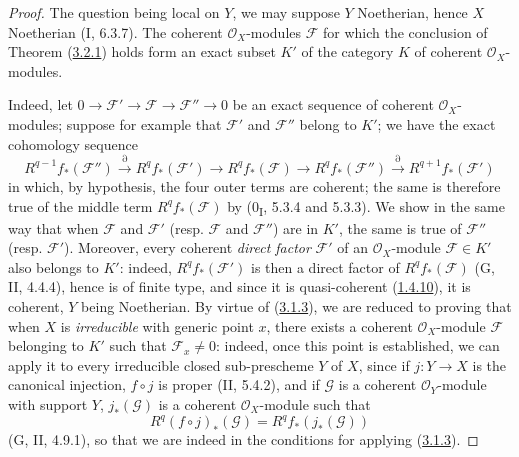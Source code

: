 \begin{proof}
The question being local on $Y$, we may suppose $Y$ Noetherian, hence $X$
Noetherian (I, 6.3.7). The coherent $\mathcal O_X$-modules $\mathcal F$ for
which the conclusion of Theorem (\hyperref[III.3.2.1]{3.2.1}) holds
form an exact subset $K'$ of the category $K$ of coherent
$\mathcal O_X$-modules.

Indeed, let
$0\to\mathcal F'\to\mathcal F\to\mathcal F''\to0$ be an exact sequence of
coherent $\mathcal O_X$-modules; suppose for example that $\mathcal F'$
and $\mathcal F''$ belong to $K'$; we have the exact cohomology sequence
\[
R^{q-1}f_*(\mathcal F'')\xrightarrow{\partial}R^qf_*(\mathcal F')
\longrightarrow R^qf_*(\mathcal F)\longrightarrow R^qf_*(\mathcal F'')
\xrightarrow{\partial}R^{q+1}f_*(\mathcal F')
\]
in which, by hypothesis, the four outer terms are coherent; the same is
therefore true of the middle term $R^qf_*(\mathcal F)$ by
(0\textsubscript{I}, 5.3.4 and 5.3.3). We show in the same way that
when $\mathcal F$ and $\mathcal F'$ (resp. $\mathcal F$ and
$\mathcal F''$) are in $K'$, the same is true of $\mathcal F''$ (resp.
$\mathcal F'$). Moreover, every coherent \emph{direct factor} $\mathcal F'$
of an $\mathcal O_X$-module $\mathcal F\in K'$ also belongs to $K'$:
indeed, $R^qf_*(\mathcal F')$ is then a direct factor of
$R^qf_*(\mathcal F)$ (G, II, 4.4.4), hence is of finite type, and since it is
quasi-coherent (\hyperref[III.1.4.10]{1.4.10}), it is coherent, $Y$
being Noetherian. By virtue of (\hyperref[III.3.1.3]{3.1.3}), we are
reduced to proving that when $X$ is \emph{irreducible} with generic point
$x$, there exists a coherent $\mathcal O_X$-module $\mathcal F$ belonging to
$K'$ such that $\mathcal F_x\neq0$: indeed, once this point is established,
we can apply it to every irreducible closed sub-prescheme $Y$ of $X$, since
if $j:Y\to X$ is the canonical injection, $f\circ j$ is proper (II, 5.4.2),
and if $\mathcal G$ is a coherent $\mathcal O_Y$-module with support $Y$,
$j_*(\mathcal G)$ is a coherent $\mathcal O_X$-module such that
\[
R^q(f\circ j)_*(\mathcal G)=R^qf_*(j_*(\mathcal G))
\]
(G, II, 4.9.1), so that we are indeed in the conditions for applying
(\hyperref[III.3.1.3]{3.1.3}).


\end{proof}
